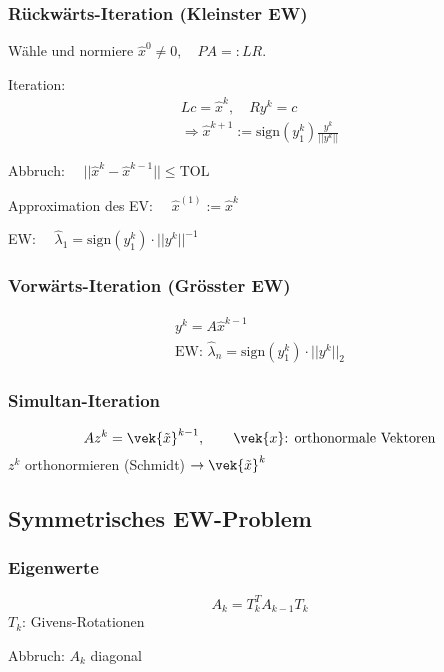 		\subsubsection{Rückwärts-Iteration (Kleinster EW)}
			\begin{tightenumerate}
				\item Wähle und normiere $\hat x^{0}\neq 0, \quad PA=:LR$. 
				\item Iteration:
				\begin{gather*}
					Lc=\hat x^{k}, \quad Ry^{k}=c \\
					\Rightarrow \hat x^{k+1}:=\text{sign}(y_1^{k})\frac{y^{k}}{||y^{k}||}
				\end{gather*}
				\item Abbruch: $\quad ||\hat x^{k}-\hat x^{k-1}||\leq \mathrm{TOL}$
				\item Approximation des EV: $\quad \hat x^{(1)}:=\hat x^k$
				\item EW: $\quad \hat \lambda_1 = \text{sign}(y_1^k)\cdot ||y^k||^{-1}$ 
			\end{tightenumerate}

		\subsubsection{Vorwärts-Iteration (Grösster EW)}
			\begin{gather*}
				y^k = A \hat x^{k-1} \\
				\text{EW: } \hat \lambda_n = \text{sign}(y_1^k) \cdot || y^k||_2
			\end{gather*}
			
		\subsubsection{Simultan-Iteration}
			\[
				Az^k = \vek{\tilde x}^{k-1}, \qquad \vek{x} \text{: orthonormale Vektoren}
			\]
			$z^k$ orthonormieren (Schmidt) $\rightarrow \vek{\tilde x}^k$
			
	\subsection{Symmetrisches EW-Problem} 
		\subsubsection{Eigenwerte}
			\[
				A_k = T_k^T A_{k-1}T_k
			\]
			$T_k$: Givens-Rotationen
			
			Abbruch: $A_k$ diagonal
			 
